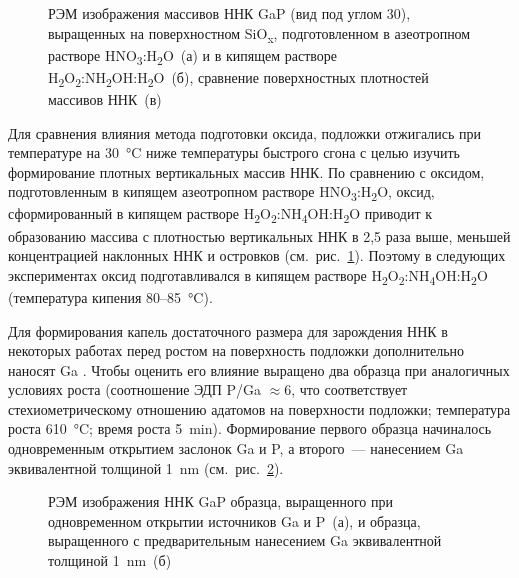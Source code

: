 \begin{figure}[ht]  \caption{РЭМ
		изображения массивов ННК GaP (вид под углом 30{\textdegree}),
		выращенных на поверхностном SiO\textsubscript{x}, подготовленном в
		азеотропном растворе HNO\textsubscript{3}:H\textsubscript{2}O~(а) и в
		кипящем растворе
		H\textsubscript{2}O\textsubscript{2}:NH\textsubscript{2}OH:H\textsubscript{2}O~(б),
	сравнение поверхностных плотностей массивов ННК~(в)}\label{fig:Image_39}
\end{figure}

Для сравнения влияния метода подготовки оксида, подложки отжигались при
температуре на 30~\si{\degreeCelsius} ниже температуры быстрого сгона с целью
изучить формирование плотных вертикальных массив ННК. По сравнению с оксидом,
подготовленным в кипящем азеотропном растворе
HNO\textsubscript{3}:H\textsubscript{2}O, оксид, сформированный в кипящем
растворе
H\textsubscript{2}O\textsubscript{2}:NH\textsubscript{4}OH:H\textsubscript{2}O
приводит к образованию массива с плотностью вертикальных ННК в 2,5 раза выше,
меньшей концентрацией наклонных ННК и островков (см.~рис.~\cref{fig:Image_39}).
Поэтому в следующих экспериментах оксид подготавливался в кипящем растворе
H\textsubscript{2}O\textsubscript{2}:NH\textsubscript{4}OH:H\textsubscript{2}O
(температура кипения 80--85~\si{\degreeCelsius}).

Для формирования капель достаточного размера для зарождения ННК в некоторых
работах перед ростом на поверхность подложки дополнительно наносят Ga
\cite{Plissard2010}. Чтобы оценить его влияние выращено два образца при
аналогичных условиях роста (соотношение ЭДП P/Ga \(\approx 6\), что соответствует
стехиометрическому отношению адатомов на поверхности подложки; температура
роста 610~\si{\degreeCelsius}; время роста 5~\si{\minute}). Формирование
первого образца начиналось одновременным открытием заслонок Ga и P, а
второго~--- нанесением Ga эквивалентной толщиной 1~\si{\nano\meter}
(см.~рис.~\cref{fig:Image_40}).

\begin{figure}[ht]  \caption{РЭМ
		изображения ННК GaP образца, выращенного при одновременном открытии
		источников Ga и P~(а), и образца, выращенного с предварительным
		нанесением Ga эквивалентной толщиной
1~{\si{\nano\metre}}~(б)}\label{fig:Image_40} \end{figure}

